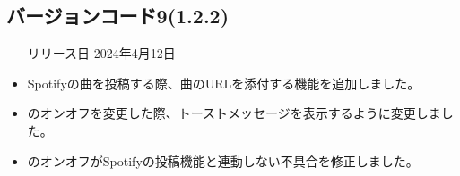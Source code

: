 \subsection*{バージョンコード9(1.2.2)}
\begin{itemize}
    \item[リリース日] 2024年4月12日
\end{itemize}

\new
\begin{itemize}
    \item Spotifyの曲を投稿する際、曲のURLを添付する機能を追加しました。
\end{itemize}

\change
\begin{itemize}
    \item \nowplaying のオンオフを変更した際、トーストメッセージを表示するように変更しました。
\end{itemize}

\fix
\begin{itemize}
    \item \nowplaying のオンオフがSpotifyの投稿機能と連動しない不具合を修正しました。
\end{itemize}
